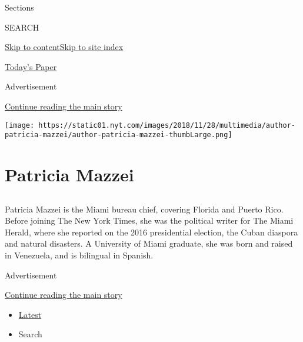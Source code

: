 Sections

SEARCH

\protect\hyperlink{site-content}{Skip to
content}\protect\hyperlink{site-index}{Skip to site index}

\href{https://myaccount.nytimes.com/auth/login?response_type=cookie\&client_id=vi}{}

\href{https://www.nytimes.com/section/todayspaper}{Today's Paper}

Advertisement

\protect\hyperlink{after-top}{Continue reading the main story}

\texttt{[image: https://static01.nyt.com/images/2018/11/28/multimedia/author-patricia-mazzei/author-patricia-mazzei-thumbLarge.png]}

\hypertarget{patricia-mazzei}{%
\section{Patricia Mazzei}\label{patricia-mazzei}}

\subsection{}

Patricia Mazzei is the Miami bureau chief, covering Florida and Puerto
Rico. Before joining The New York Times, she was the political writer
for The Miami Herald, where she reported on the 2016 presidential
election, the Cuban diaspora and natural disasters. A University of
Miami graduate, she was born and raised in Venezuela, and is bilingual
in Spanish.

Advertisement

\protect\hyperlink{after-mid1}{Continue reading the main story}

\begin{itemize}
\tightlist
\item
  \protect\hyperlink{stream-panel}{Latest}
\item
  Search
\end{itemize}

